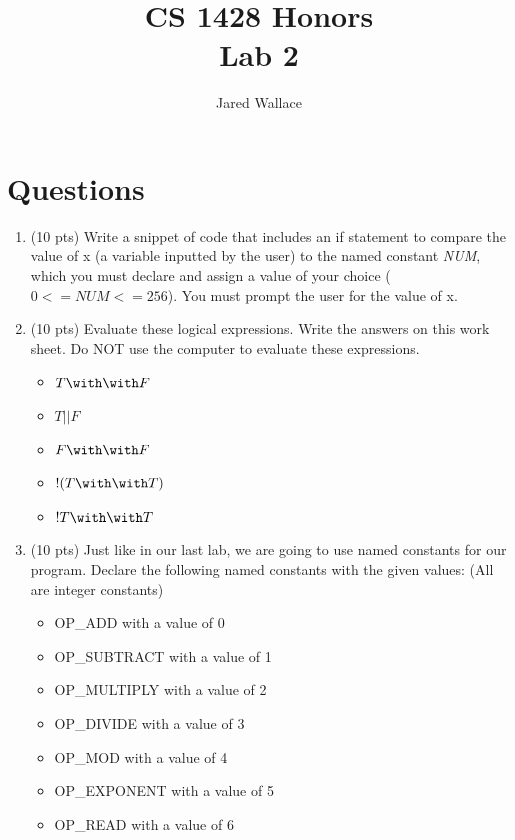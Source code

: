 \documentclass[letterpaper,12pt]{article}
\title{\Large CS 1428 Honors\\Lab 2}
\author{Jared Wallace}
\date{}
\begin{document}
\maketitle

\vspace{30mm}

\section*{Questions}

\begin{enumerate}
    \item (10 pts) Write a snippet of code that includes an if statement to compare the value of
        x (a variable inputted by the user) to the named constant \emph{NUM}, which you must declare
          and assign a value of your choice ($0<=NUM<=256$). You must prompt the user for the value of x.
    \vspace{40mm}
    \item (10 pts) Evaluate these logical expressions. Write the answers on this work sheet.
          Do NOT use the computer to evaluate these expressions.
          \begin{itemize}
              \item $T \with \with F$
            \item $T || F$
            \item $F \with \with F$
            \item $!( T \with \with T )$
            \item $!T \with \with T$
          \end{itemize}
    \vspace{30mm}
\item (10 pts) Just like in our last lab, we are going to use named constants for our program.
    Declare the following named constants with the given values: (All are integer constants)
            \begin{itemize}
                \item OP\_ADD with a value of 0
                \item OP\_SUBTRACT with a value of 1
                \item OP\_MULTIPLY with a value of 2
                \item OP\_DIVIDE with a value of 3
                \item OP\_MOD with a value of 4
                \item OP\_EXPONENT with a value of 5
                \item OP\_READ with a value of 6

\end{itemize}
\end{enumerate}
\end{document}
